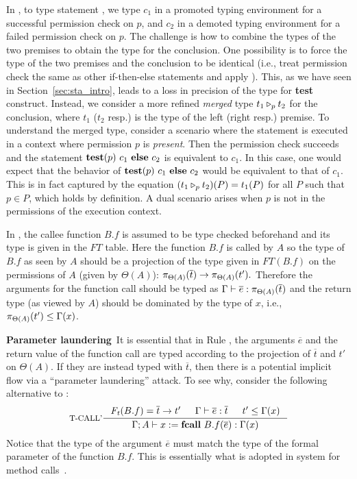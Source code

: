{{{In , to type statement ,
we type $c_1$ in a promoted typing environment for a successful permission check on $p$, and $c_2$ in a demoted typing environment for a failed permission check on $p$.
The challenge is how to combine the types of the two premises  to obtain the type
for the conclusion. One possibility is to force
the type of the two premises and the conclusion to be identical (i.e., treat permission check the same as other if-then-else statements and apply ).
This, as we have seen in Section~\ref{sec:sta_intro},
leads to a loss in precision of the type for \textbf{test} construct. Instead, we consider
a more refined \emph{merged} type $\omerge{p}{t_1}{t_2}$ for the conclusion,
where $t_1$ ($t_2$ resp.) is the type of the left (right resp.) premise.
To understand the merged type,
consider a scenario where the statement
is executed in a context where permission $p$ is \emph{present}.
Then the permission check succeeds and
the statement $\lcCP{p}{c_1}{c_2}$ is equivalent to $c_1$.
In this case, one would expect that the behavior of $\lcCP{p}{c_1}{c_2}$ would be
equivalent to that of $c_1$. This is in fact captured by the equation
$
(\omerge p {t_1} {t_2})(P) = t_1(P)
$
for all $P$ such that $p \in P$, which holds by definition. A dual scenario arises when
$p$ is not in the permissions of the execution context.

In , the callee function $B.f$ is assumed to be type checked beforehand
and its type is given in the $FT$ table. Here the function $B.f$ is called
by $A$ so the type of $B.f$ as seen by $A$ should be
a projection of the type given in $FT(B.f)$ on the permissions of $A$ (given by $\Theta(A)$):
$\app{\overline{t}}{\Theta(A)} \rightarrow \app{t'}{\Theta(A)}.$
Therefore the arguments for the function call should be typed
as
$\Gamma \vdash \overline{e} : \app{\overline{t}}{\Theta(A)}$
and the return type (as viewed by $A$) should be dominated
by the type of $x$, i.e., $\app{t'}{\Theta(A)} \leq \Gamma(x)$.


\textbf{Parameter laundering}~It is essential that in Rule , the arguments $\overline{e}$ and the return value of
the function call are typed according to the projection of $\overline{t}$ and $t'$ on $\Theta(A)$. If they are instead typed with $\overline{t}$, then there is a potential implicit flow via a ``parameter laundering'' attack. To see why, consider the following alternative to :
\begin{equation*}
\inference[T-CALL']
{
 \FT(B.f) = \overline{t} \rightarrow t' &
 \Gamma \vdash \overline{e} :\overline{t} &
 t'  \leq \Gamma(x)}
{\Gamma; A \vdash \lcCALL{x}{B.f}{\overline{e}} :
  \Gamma(x)}
\end{equation*}
Notice that the type of the argument $\overline{e}$ must match the type of the formal parameter of the function $B.f$.  This is essentially what is adopted in {\BN} system for method calls~\cite{Banerjee:2005ht}.

}}}
